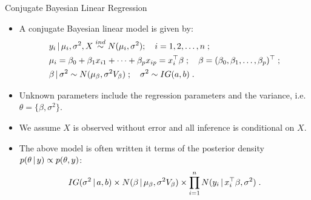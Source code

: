 \begin{frame}{Conjugate Bayesian Linear Regression}
 
\begin{itemize}\setlength{\itemsep}{0.4cm}
 \item \vskip-2mm A conjugate Bayesian linear model is given by:
\begin{align*}
& y_i\,|\, \mu_i,\sigma^2, X \stackrel{ind}{\sim} N(\mu_i,\sigma^2);\quad i=1,2,\ldots,n\;;\\
& \mu_i = \beta_0 + \beta_1x_{i1} + \cdots + \beta_{p} x_{ip} = x_i^{\top}\beta\;;\quad \beta = (\beta_0,\beta_1,\ldots,\beta_{p})^{\top}\;; \\
& \beta \,|\, \sigma^2 \sim N(\mu_{\beta}, \sigma^2 V_{\beta})\;;\quad  \sigma^2 \sim IG(a,b)\; .
\end{align*}

\item Unknown parameters include the regression parameters and the variance, i.e. $\theta = \{\beta, \sigma^2\}$. 

\item We assume $X$ is observed without error and all inference is conditional on $X$.

\item The above model is often written it terms of the posterior density $p(\theta \,|\, y) \propto p(\theta, y)$:
\begin{align*}
 IG(\sigma^2\,|\, a,b) \times N(\beta \,|\, \mu_{\beta}, \sigma^2 V_{\beta}) \times \prod_{i=1}^n N(y_i \,|\, x_i^{\top}\beta, \sigma^2)\;.
\end{align*}

\end{itemize}

\end{frame}


